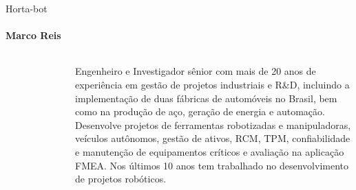 \begin{frame}[t]{Horta-bot}
    \transboxout[duration=0.5]
    \framesubtitle{Marco Reis}
    \begin{columns}
            
            \begin{figure}
                \vspace*{-0.75cm}
                \hspace*{-1.5cm}
            \end{figure}
            
                \vspace*{0.1cm}
                \justifying
                
                Engenheiro e Investigador sênior com mais de 20 anos de experiência em gestão de projetos industriais e R\&D,
                incluindo a implementação de duas fábricas de automóveis no Brasil, bem como na produção de aço, geração de
                energia e automação. Desenvolve projetos de ferramentas robotizadas e manipuladoras, veículos autônomos, gestão
                de ativos, RCM, TPM, confiabilidade e manutenção de equipamentos críticos e avaliação na aplicação FMEA. 
                Nos últimos 10 anos tem trabalhado no desenvolvimento de projetos robóticos.
    \end{columns}
\end{frame}

